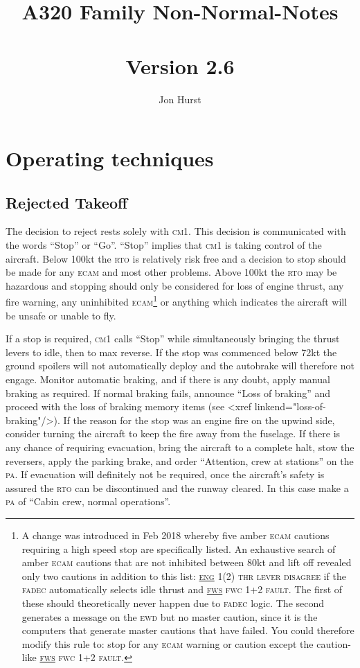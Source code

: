 \documentclass[a5paper,11pt,twoside]{book}
\title{A320 Family Non-Normal-Notes\\~\\\large{Version 2.6}}
\author{Jon Hurst}
\date{}
\newcommand{\ac}[1]{{\scshape\MakeLowercase{#1}}}
\newcommand{\ecam}[2]{{\scshape\MakeLowercase{\uline{#1} #2}}}
\begin{document}
\maketitle
\tableofcontents

\chapter{Operating techniques}
\section{Rejected Takeoff}

The decision to reject rests solely with \ac{CM1}. This decision is communicated
with the words ``Stop'' or “Go''. ``Stop'' implies that \ac{CM1} is taking
control of the aircraft. Below 100kt the \ac{RTO} is relatively risk free and a
decision to stop should be made for any \ac{ECAM} and most other problems. Above
100kt the \ac{RTO} may be hazardous and stopping should only be considered for
loss of engine thrust, any fire warning, any uninhibited \ac{ECAM}\footnote{A
change was introduced in Feb 2018 whereby five amber \ac{ECAM} cautions
requiring a high speed stop are specifically listed. An exhaustive search of
amber \ac{ECAM} cautions that are not inhibited between 80kt and lift off
revealed only two cautions in addition to this list: \ecam{ENG}{ 1(2) THR LEVER
  DISAGREE} if the \ac{FADEC} automatically selects idle thrust and
\ecam{FWS}{FWC 1+2 FAULT}. The first of these should theoretically never happen
due to \ac{FADEC} logic. The second generates a message on the \ac{EWD} but no
master caution, since it is the computers that generate master cautions that
have failed. You could therefore modify this rule to: stop for any \ac{ECAM}
warning or caution except the caution-like \ecam{FWS}{FWC 1+2 FAULT}.} or
anything which indicates the aircraft will be unsafe or unable to fly.

If a stop is required, \ac{CM1} calls ``Stop'' while simultaneously bringing the
thrust levers to idle, then to max reverse. If the stop was commenced below 72kt
the ground spoilers will not automatically deploy and the autobrake will
therefore not engage. Monitor automatic braking, and if there is any doubt,
apply manual braking as required. If normal braking fails, announce ``Loss of
braking'' and proceed with the loss of braking memory items (see <xref
linkend="loss-of-braking"/>). If the reason for the stop was an engine fire on
the upwind side, consider turning the aircraft to keep the fire away from the
fuselage. If there is any chance of requiring evacuation, bring the aircraft to
a complete halt, stow the reversers, apply the parking brake, and order
``Attention, crew at stations'' on the \ac{PA}. If evacuation will definitely
not be required, once the aircraft's safety is assured the \ac{RTO} can be
discontinued and the runway cleared. In this case make a \ac{PA} of ``Cabin
crew, normal operations''.
\end{document}
